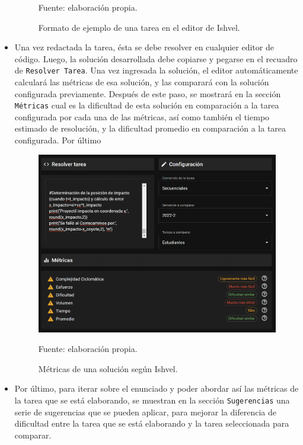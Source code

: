 \documentclass[letterpaper,12pt]{article}
\begin{document}
\begin{itemize}
\begin{figure}[H]
          \caption{Formato de ejemplo de una tarea en el editor de Ishvel.} Fuente: elaboración propia.
          \label{img:ishvel3}
        \end{figure}
  \item Una vez redactada la tarea, ésta se debe resolver en cualquier editor de código. Luego, la solución desarrollada debe copiarse y pegarse en el recuadro de \texttt{Resolver Tarea}. Una vez ingresada la solución, el editor automáticamente calculará las métricas de esa solución, y las comparará con la solución configurada previamente. Después de este paso, se mostrará en la sección \texttt{Métricas} cual es la dificultad de esta solución en comparación a la tarea configurada por cada una de las métricas, así como también el tiempo estimado de resolución, y la dificultad promedio en comparación a la tarea configurada. Por último
        \begin{figure}[H]
          \centering
          \includegraphics[width=1\textwidth]{figures/ishvel4.png}
          \caption{Métricas de una solución según Ishvel.} Fuente: elaboración propia.
          \label{img:ishvel4}
        \end{figure}
  \item Por último, para iterar sobre el enunciado y poder abordar así las métricas de la tarea que se está elaborando, se muestran en la sección \texttt{Sugerencias} una serie de sugerencias que se pueden aplicar, para mejorar la diferencia de dificultad entre la tarea que se está elaborando y la tarea seleccionada para comparar.


\end{itemize}
\end{document}
